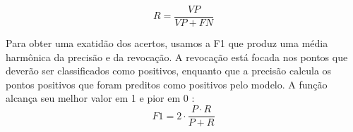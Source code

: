 \begin{equation}
    \label{eq:recall}
    R = \frac{VP}{VP+FN}
\end{equation}

Para obter uma exatidão dos acertos, usamos a F1 que produz uma média harmônica da precisão e da revocação. A revocação está focada nos pontos que deverão ser classificados como positivos, enquanto que a precisão calcula os pontos positivos que foram preditos como positivos pelo modelo. A função alcança seu melhor valor em 1 e pior em 0 \cite{f1}: 
\begin{equation}
    F1 = 2 \cdot \frac{P\cdot R}{P + R}
\end{equation}

